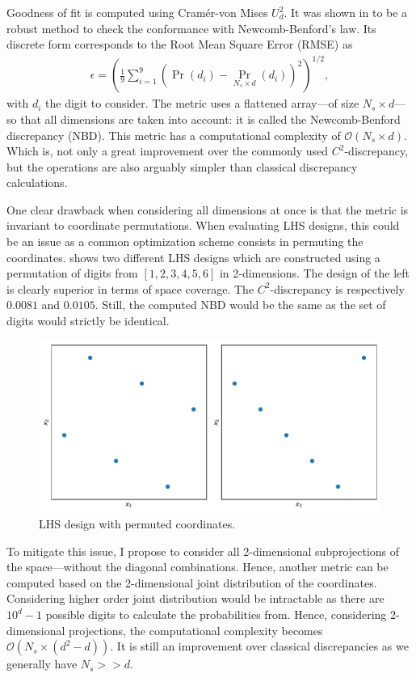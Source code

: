 \documentclass[1p,authoryear]{elsarticle}
\begin{document}
Goodness of fit is computed using Cramér-von Mises $U_d^2$. It was shown in \citep{Lesperance2016} to be a robust method to check the conformance with Newcomb-Benford's law. Its discrete form corresponds to the Root Mean Square Error (RMSE) as
\begin{align}
\epsilon = \left( \frac{1}{9} \displaystyle \sum_{i=1}^{9} \left(\Pr(d_i) - \Pr_{N_s\times d} (d_i)\right)^2 \right)^{1/2},
\end{align}
\noindent with $d_i$ the digit to consider. The metric uses a flattened array---of size $N_s \times d$---so that all dimensions are taken into account: it is called the Newcomb-Benford discrepancy (NBD). This metric has a computational complexity of $\mathcal{O}(N_s \times d)$. Which is, not only a great improvement over the commonly used $C^2$-discrepancy, but the operations are also arguably simpler than classical discrepancy calculations.

One clear drawback when considering all dimensions at once is that the metric is invariant to coordinate permutations. When evaluating LHS designs, this could be an issue as a common optimization scheme consists in permuting the coordinates.  shows two different LHS designs which are constructed using a permutation of digits from $[1, 2, 3, 4, 5, 6]$ in 2-dimensions. The design of the left is clearly superior in terms of space coverage. The $C^2$-discrepancy is respectively $0.0081$ and $0.0105$. Still, the computed NBD would be the same as the set of digits would strictly be identical.


\begin{figure}[!h]               
\centering

\includegraphics[width=0.7\linewidth,height=\textheight,keepaspectratio]{fig/lhs.pdf}

\caption{LHS design with permuted coordinates.}
\label{fig:lhs}
\end{figure}


To mitigate this issue, I propose to consider all 2-dimensional subprojections of the space---without the diagonal combinations. Hence, another metric can be computed based on the 2-dimensional joint distribution of the coordinates. Considering higher order joint distribution would be intractable as there are $10^d-1$ possible digits to calculate the probabilities from. Hence, considering 2-dimensional projections, the computational complexity becomes $\mathcal{O}(N_s\times (d^2-d))$. It is still an improvement over classical discrepancies as we generally have $N_s >> d$.
\end{document}
